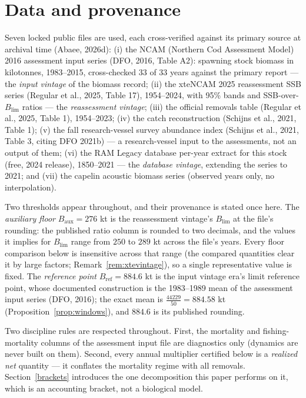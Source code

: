 \documentclass[10pt,twocolumn]{article}
\theoremstyle{plain}
\theoremstyle{remark}
\begin{document}
\section{Data and provenance}\label{data}

Seven locked public files are used, each cross-verified against its
primary source at archival time (Abaee, 2026d): (i) the NCAM (Northern Cod Assessment Model) 2016
assessment input series (DFO, 2016, Table A2): spawning stock biomass
in kilotonnes, 1983--2015, cross-checked 33 of 33 years against the
primary report --- the \emph{input vintage} of the biomass record;
(ii) the xteNCAM 2025 reassessment SSB series (Regular et al., 2025,
Table 17), 1954--2024, with 95\% bands and SSB-over-\(B_{\mathrm{lim}}\)
ratios --- the \emph{reassessment vintage}; (iii) the official
removals table (Regular et al., 2025, Table 1), 1954--2023; (iv) the
catch reconstruction (Schijns et al., 2021, Table 1); (v) the fall
research-vessel survey abundance index (Schijns et al., 2021, Table 3,
citing DFO 2021b) --- a research-vessel input to the assessments, not
an output of them; (vi) the RAM Legacy database per-year extract for
this stock (free, 2024 release), 1850--2021 --- the \emph{database
vintage}, extending the series to 2021; and (vii) the capelin acoustic
biomass series (observed years only, no interpolation).

Two thresholds appear throughout, and their provenance is stated once
here. The \emph{auxiliary floor} \(B_{\mathrm{aux}} = 276\) kt is the
reassessment vintage's \(B_{\mathrm{lim}}\) at the file's rounding: the
published ratio column is rounded to two decimals, and the values it
implies for \(B_{\mathrm{lim}}\) range from \(250\) to \(289\) kt
across the file's years. Every floor comparison below is insensitive
across that range (the compared quantities clear it by large factors;
Remark~\ref{rem:xtevintage}), so a single representative value is
fixed. The \emph{reference point} \(B_{\mathrm{ref}} = 884.6\) kt is
the input vintage era's limit reference point, whose documented
construction is the 1983--1989 mean of the assessment input series
(DFO, 2016); the exact mean is
\(\tfrac{44229}{50} = 884.58\) kt (Proposition~\ref{prop:windows}),
and \(884.6\) is its published rounding.

Two discipline rules are respected throughout. First, the mortality
and fishing-mortality columns of the assessment input file are
diagnostics only (dynamics are never built on them). Second, every
annual multiplier certified below is a \emph{realized net} quantity ---
it conflates the mortality regime with all removals. Section~\ref{brackets}
introduces the one decomposition this paper performs on it, which is
an accounting bracket, not a biological model.
\end{document}

